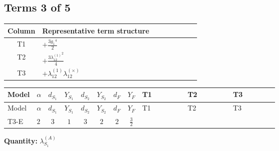 \documentclass[8pt]{article}
\begin{document}
\begin{landscape}
\subsection*{Terms 3 of 5}
\begin{center}
\begin{tabular}{@{}c >{\raggedright\arraybackslash}p{0.82\linewidth}@{}}
\toprule
Column & Representative term structure \\
\midrule
T1 & \(\displaystyle +\frac{3 {g_1}^4}{2}\) \\
\midrule
T2 & \(\displaystyle +\frac{3 {\lambda_{12}^{(1)}}^2}{4}\) \\
\midrule
T3 & \(\displaystyle +{\lambda_{12}^{(1)}} {\lambda_{12}^{(\times)}}\) \\
\midrule
\bottomrule
\end{tabular}
\end{center}
\smallskip
\tiny
\begin{longtable}{@{}llcccccc >{\raggedright\arraybackslash}p{0.21\linewidth} >{\raggedright\arraybackslash}p{0.21\linewidth} >{\raggedright\arraybackslash}p{0.21\linewidth}@{}}
\toprule
Model & $\alpha$ & $d_{S_1}$ & $Y_{S_1}$ & $d_{S_2}$ & $Y_{S_2}$ & $d_F$ & $Y_F$ & T1 & T2 & T3 \\
\midrule
\endfirsthead
\toprule
Model & $\alpha$ & $d_{S_1}$ & $Y_{S_1}$ & $d_{S_2}$ & $Y_{S_2}$ & $d_F$ & $Y_F$ & T1 & T2 & T3 \\
\midrule
\endhead
T3-E & $2$ & $3$ & $1$ & $3$ & $2$ & $2$ & $\frac{3}{2}$ & \scriptsize\adjustbox{max width=\linewidth}{$\begin{gathered} +\frac{3 {g_1}^4}{2}\end{gathered}$} & \scriptsize\adjustbox{max width=\linewidth}{$\begin{gathered} +\frac{3 {\lambda_{12}^{(1)}}^2}{4}\end{gathered}$} & \scriptsize\adjustbox{max width=\linewidth}{$\begin{gathered} +{\lambda_{12}^{(1)}} {\lambda_{12}^{(\times)}}\end{gathered}$} \\
\midrule
\bottomrule
\end{longtable}
\clearpage
\noindent\textbf{Quantity: }$\lambda_{S_1}^{(A)}$\par\smallskip

\end{landscape}
\end{document}
